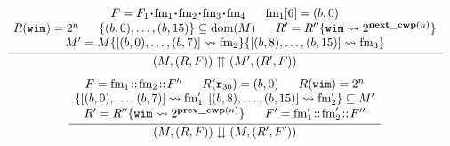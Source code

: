 \begin{figure}[!t]
    \centering
    \[
		\begin{array}{c}
			\infer
			{
				\winOverFlow{(\mem, (\RFile, \Wstack))}{(\mem', (\RFile', \Wstack))}
			}
			{
                \begin{array}{c}
                    \Wstack = \Wstack_1 \lstApp \fm_1 \lstApp \fm_2 \lstApp 
                        \fm_3 \lstApp \fm_4 \quad  \ \ \fm_1[6] = (\block, 0) \\
                    \RFile(\regwim) = 2^n \quad \ \ 
                    \{ (\block, 0), \dots, (\block, 15) \} \subseteq \dom(\mem) \quad \ \ 
                    \RFile' = \RFile''\{ \regwim \rightsquigarrow 2^{\nextcwp{(n)}} \} \\
                    \mem' = \mem\{ \Array{(\block, 0), \dots, (\block, 7)} \rightsquigarrow \fm_2 \}
						\{ \Array{(\block, 8), \dots, (\block, 15)} \rightsquigarrow \fm_3 \}
				\end{array}
			} \\
			\\[-5pt]
			\infer
			{
				\winUnderFlow{(\mem, (\RFile, \Wstack))}{(\mem, (\RFile', \Wstack'))}
			}
			{
                \begin{array}{c}
                    \Wstack = \fm_1 \stCons \fm_2 \stCons \Wstack'' \quad \ \ 
                    \RFile(\reg{30}) = (\block, 0) \quad \ \ \RFile(\regwim) = 2^n \\ 
                    \{
						\Array{(\block, 0), \dots, (\block, 7)} \rightsquigarrow \fm_1', 
						\Array{(\block, 8), \dots, (\block, 15)} \rightsquigarrow \fm_2'
                    \} \subseteq \mem' \\
                    \RFile' = \RFile''\{\regwim \rightsquigarrow 2^{\prevcwp{(n)}}\} \quad \ \ 
                    \Wstack' = \fm_1' \stCons \fm_2' \stCons \Wstack'' 

\end{array}}
\end{array}\]
\end{figure}
